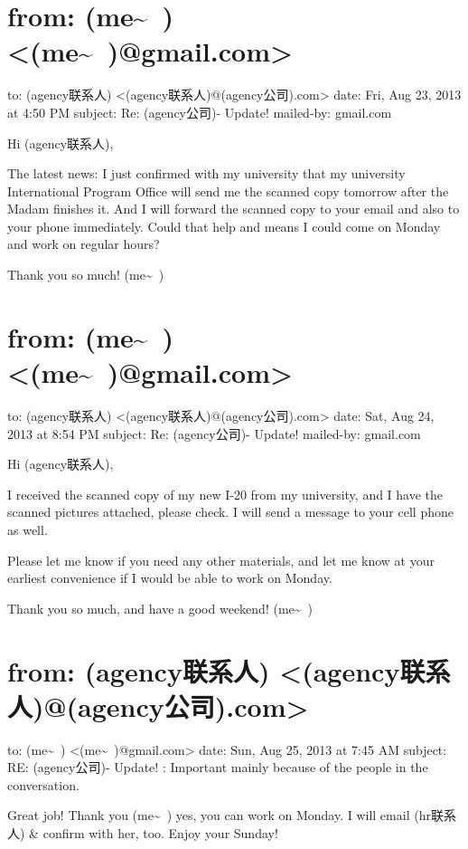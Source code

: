 \documentclass[12pt]{book}
\begin{document}
\section{from:         (me\textasciitilde{}~) <(me\textasciitilde{}~)@gmail.com>}
\label{sec-35-20}
to:         (agency联系人) <(agency联系人)@(agency公司).com>
date:         Fri, Aug 23, 2013 at 4:50 PM
subject:         Re: (agency公司)- Update!
mailed-by:         gmail.com

Hi (agency联系人), 

The latest news: I just confirmed with my university that my university International Program Office will send me the scanned copy tomorrow after the Madam finishes it. And I will forward the scanned copy to your email and also to your phone immediately. Could that help and means I could come on Monday and work on regular hours?

Thank you so much!
(me\textasciitilde{}~)


\section{from:         (me\textasciitilde{}~) <(me\textasciitilde{}~)@gmail.com>}
\label{sec-35-21}
to:         (agency联系人) <(agency联系人)@(agency公司).com>
date:         Sat, Aug 24, 2013 at 8:54 PM
subject:         Re: (agency公司)- Update!
mailed-by:         gmail.com

Hi (agency联系人), 

I received the scanned copy of my new I-20 from my university, and I have the scanned pictures attached, please check. I will send a message to your cell phone as well. 

Please let me know if you need any other materials, and let me know at your earliest convenience if I would be able to work on Monday. 

Thank you so much, and have a good weekend!
(me\textasciitilde{}~)


\section{from:         (agency联系人) <(agency联系人)@(agency公司).com>}
\label{sec-35-22}
to:         (me\textasciitilde{}~) <(me\textasciitilde{}~)@gmail.com>
date:         Sun, Aug 25, 2013 at 7:45 AM
subject:         RE: (agency公司)- Update!
:         Important mainly because of the people in the conversation.

Great job! Thank you (me\textasciitilde{}~) yes, you can work on Monday. I will email (hr联系人) \& confirm with her, too. Enjoy your Sunday!
\end{document}
